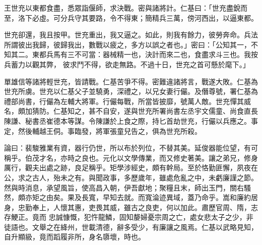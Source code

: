 \begin{pinyinscope}
 王世充以東都食盡，悉眾詣偃師，求決戰。密與諸將計。仁基曰：「世充盡銳而至，洛下必虛。可分兵守其要路，令不得東；簡精兵三萬，傍河西出，以逼東都。



 世充卻還，我且按甲。世充重出，我又逼之。如此，則我有餘力，彼勞奔命。兵法所謂彼出我歸，彼歸我出，數戰以疲之，多方以誤之者也。」密曰：「公知其一，不知其二。東都兵馬有三不可當：器械精一也，決計而來二也，食盡求斗三也。我按兵蓄力以觀其弊，
 彼求鬥不得，欲走無路。不過十日，世充之首可懸於麾下。」



 單雄信等諸將輕世充，皆請戰。仁基苦爭不得。密難違諸將言，戰遂大敗。仁基為世充所虜。世充以仁基父子並驍勇，深禮之，以兄女妻行儼。及僭尊號，署仁基為禮部尚書，行儼為左輔大將軍。行儼每戰，所當皆披靡，號萬人敵。世充憚其威名，頗加猜防。仁基知之，甚不自安，遂與世充所署尚書左丞宇文儒童、尚食直長陳謙、秘書丞崔德本等謀。令陳謙於上食之際，持匕首劫世充，行儼以兵應之。事定，然後輔越王侗。事臨發，將軍張童兒告之，俱為世充所殺。



 論曰：裴駿雅業有資，器行仍世，所以布於列位，不替其美。延俊器能位望，有可稱乎。伯茂才名，亦時之良也。元化以文學傳業，而又修史著美。讓之弟兄，修身厲行，觀夫出處之跡，良足稱乎。矩學涉經史，頗有幹局。至於恪勤匪懈，夙夜在公，求之古人，殆未之有。與聞政事，多歷歲年，雖處危亂之中，未虧廉謹之節。然與時消息，承望風旨，使高昌入朝，伊吾獻地；聚糧且末，師出玉門，關右騷然，頗亦矩之由矣。果及長寬，早知去就。而寬淪迹異域，蓋乃命乎。嵩和廉約居身，忠勤奉上，人懷其惠，吏畏其威，雖古之良吏，何以加此。肅歷官周、隋，志存鯁正。竟而
 忠誠慷慨，犯忤龍鱗，固知嫠婦憂宗周之亡，處女悲太子之少，非徒語也。文舉之在絳州，世載清德，辭多受少，有廉讓之風焉。仁基以武略見知，自升顯級，竟而蹈履非所，身名隳壞，時也。



\end{pinyinscope}